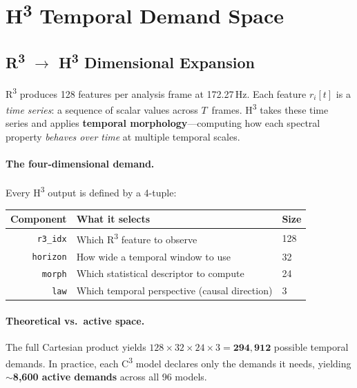 
\section{H\textsuperscript{3} Temporal Demand Space}

\subsection{R\textsuperscript{3} $\to$ H\textsuperscript{3} Dimensional Expansion}
\label{subsec:r3-h3-expansion}

R\textsuperscript{3} produces 128 features per analysis frame at 172.27\,Hz.
Each feature $r_i[t]$ is a \emph{time series}: a sequence of scalar values
across $T$~frames. H\textsuperscript{3} takes these time series and applies
\textbf{temporal morphology}---computing how each spectral property
\emph{behaves over time} at multiple temporal scales.

\paragraph{The four-dimensional demand.}
Every H\textsuperscript{3} output is defined by a 4-tuple:

\begin{center}
\begin{tabular}{@{}rll@{}}
\toprule
\textbf{Component} & \textbf{What it selects} & \textbf{Size} \\
\midrule
\texttt{r3\_idx}  & Which R\textsuperscript{3} feature to observe  & 128 \\
\texttt{horizon}  & How wide a temporal window to use               & 32  \\
\texttt{morph}    & Which statistical descriptor to compute          & 24  \\
\texttt{law}      & Which temporal perspective (causal direction)     & 3   \\
\bottomrule
\end{tabular}
\end{center}

\paragraph{Theoretical vs.\ active space.}
The full Cartesian product yields $128 \times 32 \times 24 \times 3
= \mathbf{294{,}912}$ possible temporal demands.
In practice, each C\textsuperscript{3} model declares only the demands it needs,
yielding $\sim$\textbf{8{,}600 active demands} across all 96 models.

